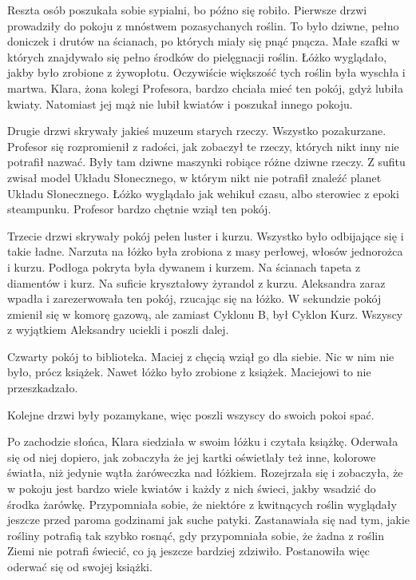 Reszta osób poszukała sobie sypialni, bo późno się robiło.
Pierwsze drzwi prowadziły do pokoju z mnóstwem pozasychanych roślin.
To było dziwne, pełno doniczek i drutów na ścianach, po których miały się pnąć pnącza.
Małe szafki w których znajdywało się pełno środków do pielęgnacji roślin.
Łóżko wyglądało, jakby było zrobione z żywopłotu.
Oczywiście większość tych roślin była wyschła i martwa.
Klara, żona kolegi Profesora, bardzo chciała mieć ten pokój, gdyż lubiła kwiaty.
Natomiast jej mąż nie lubił kwiatów i poszukał innego pokoju.

Drugie drzwi skrywały jakieś muzeum starych rzeczy. Wszystko pozakurzane.
Profesor się rozpromienił z radości, jak zobaczył te rzeczy, których nikt inny nie potrafił nazwać.
Były tam dziwne maszynki robiące różne dziwne rzeczy.
Z sufitu zwisał model Układu Słonecznego, w którym nikt nie potrafił znaleźć planet Układu Słonecznego.
Łóżko wyglądało jak wehikuł czasu, albo sterowiec z epoki steampunku.
Profesor bardzo chętnie wziął ten pokój.

Trzecie drzwi skrywały pokój pełen luster i kurzu.
Wszystko było odbijające się i takie ładne.
Narzuta na łóżko była zrobiona z masy perłowej, włosów jednorożca i kurzu.
Podłoga pokryta była dywanem i kurzem.
Na ścianach tapeta z diamentów i kurz.
Na suficie kryształowy żyrandol z kurzu.
Aleksandra zaraz wpadła i zarezerwowała ten pokój, rzucając się na łóżko.
W sekundzie pokój zmienił się w komorę gazową, ale zamiast Cyklonu B, był Cyklon Kurz.
Wszyscy z wyjątkiem Aleksandry uciekli i poszli dalej.

Czwarty pokój to biblioteka.
Maciej z chęcią wziął go dla siebie.
Nic w nim nie było, prócz książek.
Nawet łóżko było zrobione z książek.
Maciejowi to nie przeszkadzało.

Kolejne drzwi były pozamykane, więc poszli wszyscy do swoich pokoi spać.

\divider{}

Po zachodzie słońca, Klara siedziała w swoim łóżku i czytała książkę.
Oderwała się od niej dopiero, jak zobaczyła że jej kartki oświetlały też inne, kolorowe światła, niż jedynie wątła żaróweczka nad łóżkiem.
Rozejrzała się i zobaczyła, że w pokoju jest bardzo wiele kwiatów i każdy z nich świeci, jakby wsadzić do środka żarówkę. Przypomniała sobie, że niektóre z kwitnących roślin wyglądały jeszcze przed paroma godzinami jak suche patyki. Zastanawiała się nad tym, jakie rośliny potrafią tak szybko rosnąć, gdy przypomniała sobie, że żadna z roślin Ziemi nie potrafi świecić, co ją jeszcze bardziej zdziwiło.
Postanowiła więc oderwać się od swojej książki.

